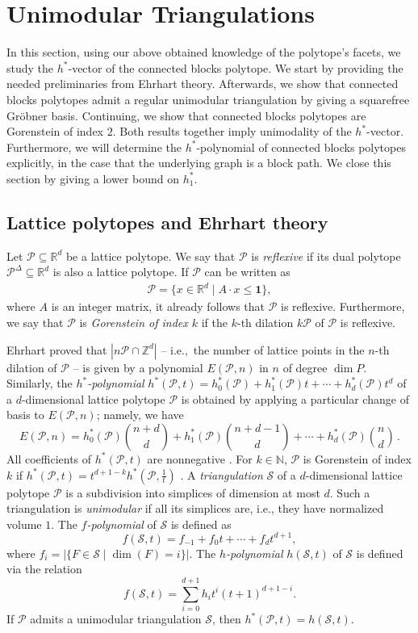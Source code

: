 \documentclass[12pt]{amsart}
\newcommand{\N}{\mathbb{N}}
\newcommand{\Z}{\mathbb{Z}}
\newcommand{\R}{\mathbb{R}}
\newcommand{\Pc}{\mathcal{P}}
\renewcommand{\P}{\mathcal{P}}
\begin{document}
\section{Unimodular Triangulations}

\label{sectionUnimodularTriangulations}

In this section, using our above obtained knowledge of the polytope's facets, we study the $h^\ast$-vector of the connected blocks polytope. We start by providing the needed preliminaries from Ehrhart theory. Afterwards, we show that connected blocks polytopes admit a regular unimodular triangulation by giving a squarefree Gr\"obner basis. Continuing, we show that connected blocks polytopes are Gorenstein of index $2$. Both results together imply unimodality of the $h^\ast$-vector. Furthermore, we will determine the $h^\ast$-polynomial of connected blocks polytopes explicitly, in the case that the underlying graph is a block path. We close this section by giving a lower bound on $h^\ast_1$.

\subsection*{Lattice polytopes and Ehrhart theory}
Let $\Pc \subseteq \R^d$ be a lattice polytope. We say that $\P$ is \emph{reflexive} if its dual polytope $\P^\Delta \subseteq \R^d$ is also a lattice polytope. If $\P$ can be written as
\begin{align*}
    \P=\{x \in \R^d \mid A \cdot x \le \mathbf{1} \},
\end{align*}
where $A$ is an integer matrix, it already follows that $\P$ is reflexive. Furthermore, we say that $\P$ is \emph{Gorenstein of index $k$} if the $k$-th dilation $k\P$ of $\P$ is reflexive.

Ehrhart \cite{Ehrhart} proved that $|n\Pc\cap\Z^d|$ -- i.e.,~the number of lattice points in the $n$-th dilation of $\Pc$ -- is given by a polynomial $E(\Pc,n)$ in $n$ of degree $\dim P$. Similarly, the  \emph{$h^\ast$-polynomial} $h^\ast(\Pc,t)=h_0^\ast(\Pc)+h_1^\ast (\Pc)t+\cdots +h_d^\ast(\Pc) t^d$ of a $d$-dimensional lattice polytope $\Pc$ is obtained by applying a particular change of basis to $E(\Pc,n)$; namely, we have
\[
E(\Pc,n)=h_0^\ast(\Pc) {n+d\choose d}+h_1 ^\ast(\Pc) {n+d-1\choose d} +\cdots + h_d^\ast (\Pc){n\choose d} \, .
\]
All coefficients of $h^\ast(\P,t)$ are nonnegative \cite{Stanley}. For $k\in \N$, $\Pc$ is Gorenstein of index $k$ if $h^\ast(\Pc,t)=t^{d+1-k} h^\ast\left(\Pc,\frac{1}{t}\right)$ \cite{Hib}. 
A \emph{triangulation} $\mathcal{S}$ of a $d$-dimensional lattice polytope $\Pc$ is a subdivision into simplices of dimension at most $d$. 
Such a triangulation is \emph{unimodular} if all its simplices are, i.e., they have normalized volume $1$. The \emph{$f$-polynomial} of $\mathcal{S}$ is defined as 
\[
f(\mathcal{S},t)=f_{-1}+f_0t+\cdots +f_dt^{d+1},
\]
where $f_i=|\{F\in\mathcal{S}\mid \dim(F)=i\}|$. The \emph{$h$-polynomial} $h(\mathcal{S},t)$ of $\mathcal{S}$ is defined via the relation 
\[
f(\mathcal{S},t)=\sum_{i=0}^{d+1}h_it^i(t+1)^{d+1-i}.
\]
If $\Pc$ admits  a unimodular triangulation $\mathcal{S}$, then $h^\ast(\Pc,t)=h(\mathcal{S},t)$. 
\end{document}
